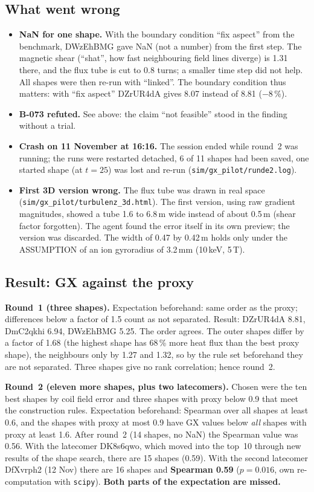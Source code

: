 \subsection{What went wrong}
\begin{itemize}\itemsep1pt
\item \textbf{NaN for one shape.} With the boundary condition ``fix aspect'' from the benchmark, DWzEhBMG gave NaN (not a number) from the first step. The magnetic shear (``shat'', how fast neighbouring field lines diverge) is 1.31 there, and the flux tube is cut to 0.8 turns;
a smaller time step did not help. All shapes were then re-run with ``linked''. The boundary condition thus matters: with ``fix aspect'' DZrUR4dA gives 8.07 instead of 8.81 ($-8\,\%$).
\item \textbf{B-073 refuted.} See above: the claim ``not feasible'' stood in the finding without a trial.
\item \textbf{Crash on 11 November at 16:16.} The session ended while round~2 was running; the runs were restarted detached, 6 of 11 shapes had been saved, one started shape (at $t=25$) was lost and re-run (\texttt{sim/gx\_pilot/runde2.log}).
\item \textbf{First 3D version wrong.} The flux tube was drawn in real space (\texttt{sim/gx\_pilot/turbulenz\_3d.html}). The first version, using raw gradient magnitudes, showed a tube 1.6 to 6.8\,m wide instead of about 0.5\,m (shear factor forgotten). The agent found the error itself in its own preview; the version was discarded. The width of 0.47 by 0.42\,m holds only under the ASSUMPTION of an ion gyroradius of 3.2\,mm (10\,keV, 5\,T).
\end{itemize}

\subsection{Result: GX against the proxy}
\textbf{Round~1 (three shapes).} Expectation beforehand: same order as the proxy; differences below a factor of 1.5 count as not separated. Result: DZrUR4dA 8.81, DmC2qkhi 6.94, DWzEhBMG 5.25. The order agrees. The outer shapes differ by a factor of 1.68 (the highest shape has 68\,\% more heat flux than the best proxy shape),
the neighbours only by 1.27 and 1.32, so by the rule set beforehand they are not separated. Three shapes give no rank correlation; hence round~2.

\textbf{Round~2 (eleven more shapes, plus two latecomers).} Chosen were the ten best shapes by coil field error and three shapes with proxy below 0.9 that meet the construction rules. Expectation beforehand: Spearman over all shapes at least 0.6, and the shapes with proxy at most 0.9 have GX values below \emph{all} shapes with proxy at least 1.6.
After round~2 (14 shapes, no NaN) the Spearman value was 0.56. With the latecomer DK8s6qwo, which moved into the top~10 through new results of the shape search, there are 15 shapes (0.59). With the second latecomer DfXvrph2 (12 Nov) there are 16 shapes and \textbf{Spearman 0.59} ($p=0.016$, own re-computation with \texttt{scipy}). \textbf{Both parts of the expectation are missed.}

